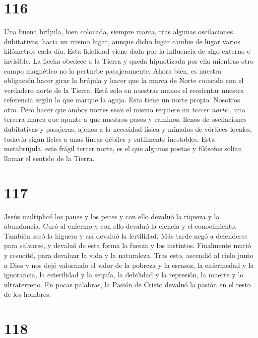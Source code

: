 \documentclass[a4paper,11pt,openright,twocolumn]{book}
\begin{document}
\section*{116}

Una buena brújula, bien colocada, siempre marca, tras algunas oscilaciones dubitativas, hacia un mismo
lugar, aunque dicho lugar cambie de lugar varios kilómetros cada día. Esta fidelidad viene dada por
la influencia de algo externo e invisible. La flecha obedece a la Tierra y queda hipnotizada por ella
mientras otro campo magnético no la perturbe pasajeramente. Ahora bien, es nuestra obligación hacer
girar la brújula y hacer que la marca de Norte coincida con el verdadero norte de la Tierra. Está solo en 
nuestras manos el reorientar nuestra referencia según lo que marque la aguja. Esta tiene un norte propio.
Nosotros otro. Pero hacer que ambos nortes sean el mismo requiere un {\it tercer norte}  , una tercera marca
que apunte a que nuestros pasos y caminos, llenos de oscilaciones dubitativas y pasajeras, ajenos a la necesidad
física y minados de vórtices locales, todavía sigan fieles a unas líneas débiles y sutilmente inestables. Esta
metabrújula, este frágil tercer norte, es el que algunos poetas y filósofos solían llamar el sentido de la Tierra.

\section*{117}

Jesús multiplicó los panes y los peces y con ello devaluó la riqueza y la abundancia. Curó al enfermo
y con ello devaluó la ciencia y el conocimiento. También secó la higuera y así devaluó la fertilidad.
Más tarde negó a defenderse para salvarse, y devaluó de esta forma la fuerza y los instintos. Finalmente
murió y resucitó, para devaluar la vida y la naturaleza. Tras esto, ascendió al cielo junto a Dios y nos
dejó valorando el valor de la pobreza y la escasez, la enfermedad y la ignorancia, la esterilidad y la
sequía, la debilidad y la represión, la muerte y lo ultraterreno. En pocas palabras, la Pasión de Cristo
devaluó la pasión en el resto de los hombres. 

\section*{118}
\end{document}
